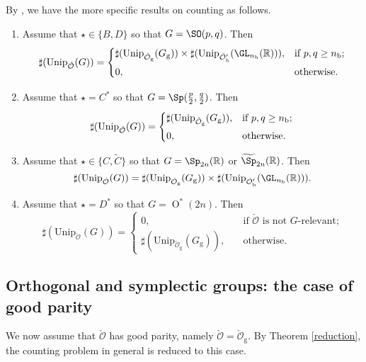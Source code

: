 \documentclass[12pt]{amsart}
\newcommand{\CO}{{\mathcal {O}}}
\newcommand{\oO}{\operatorname{O}}
\newcommand{\R}{\mathbb R}
\numberwithin{equation}{section}
\theoremstyle{remark}
\def\Unip{\mathrm{Unip}}
\begin{document}
By , we have the more specific results on counting as follows.
\begin{enumerate}[label=(\alph*)]
  \item Assume that $\star\in \{B,D\}$ so that $G=\SO(p,q)$. Then
        \[
        \sharp(\Unip_{\check \CO}(G))=
        \begin{cases}
          \sharp(\Unip_{\check \CO_{\mathrm g}}(G_{\mathrm g}))\times \sharp(\Unip_{\check \CO'_{\mathrm b}}(\GL_{n_\mathrm b}(\R)) ), &\hbox{if $p,q\geq n_\mathrm b$}; \smallskip\\
          0, &\hbox{otherwise.}
        \end{cases}
        \]
  \item Assume that $\star=C^*$ so that $G=\Sp(\frac{p}{2},\frac{q}{2})$. Then
        \[
        \sharp(\Unip_{\check \CO}(G))=
        \begin{cases}
          \sharp(\Unip_{\check \CO_{\mathrm g}}(G_{\mathrm g} )), &\hbox{if $p,q\geq n_\mathrm b$}; \smallskip\\
          0, &\hbox{otherwise.}
        \end{cases}
        \]

  \item Assume that $\star\in \{C,\widetilde C\}$ so that $G=\Sp_{2n}(\R)$ or
        $\widetilde \Sp_{2n}(\R)$. Then
        \[
        \sharp(\Unip_{\check \CO}(G))= \sharp(\Unip_{\check \CO_{\mathrm g}}(G_{\mathrm g}))\times \sharp(\Unip_{\check \CO'_{\mathrm b}}(\GL_{n_\mathrm b}(\R)) ). \]
  \item Assume that $\star =D^*$ so that $G=\oO^*(2n)$. Then
        \[
          \sharp(\Unip_{\check \CO}(G))=
          \begin{cases}
          0,&\quad \textrm{if $\check \CO$  is not $G$-relevant;}\\
          \sharp(\Unip_{\check \CO_{\mathrm g}}(G_{\mathrm g})),&\quad \textrm{otherwise}.
          \end{cases}
        \]
\end{enumerate}


 \subsection{Orthogonal and symplectic groups: the case of good parity}\label{secorgp0}
 We now assume that $\check \CO$ has good parity, namely
 $\check \CO=\check \CO_{\mathrm g}$. By Theorem \ref{reduction}, the counting
 problem in general is reduced to this case.
\end{document}
